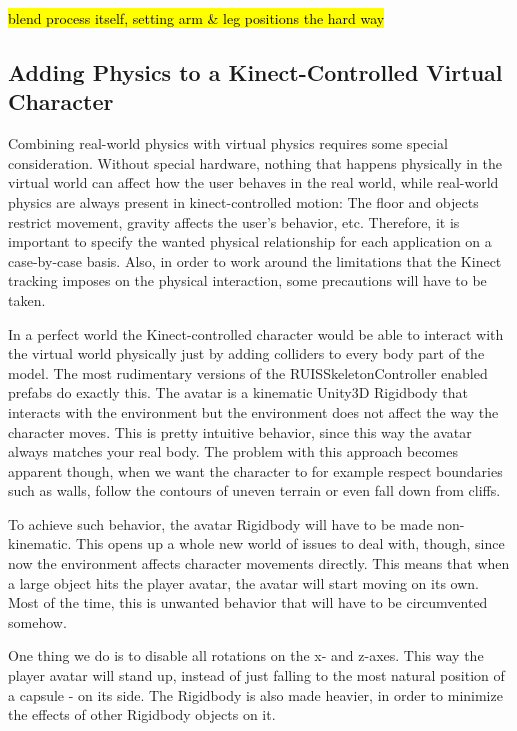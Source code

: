 \documentclass[12pt,a4paper,oneside,pdftex]{report}
\begin{document}
\hl{blend process itself, setting arm & leg positions the hard way}

\subsection{Adding Physics to a Kinect-Controlled Virtual Character}
\label{subsection:skeletontracking:physics}

Combining real-world physics with virtual physics requires some special consideration. Without special hardware, nothing that happens physically in the virtual world can affect how the user behaves in the real world, while real-world physics are always present in kinect-controlled motion: The floor and objects restrict movement, gravity affects the user's behavior, etc. Therefore, it is important to specify the wanted physical relationship for each application on a case-by-case basis. Also, in order to work around the limitations that the Kinect tracking imposes on the physical interaction, some precautions will have to be taken.

In a perfect world the Kinect-controlled character would be able to interact with the virtual world physically just by adding colliders to every body part of the model. The most rudimentary versions of the RUISSkeletonController enabled prefabs do exactly this. The avatar is a kinematic Unity3D Rigidbody that interacts with the environment but the environment does not affect the way the character moves. This is pretty intuitive behavior, since this way the avatar always matches your real body. The problem with this approach becomes apparent though, when we want the character to for example respect boundaries such as walls, follow the contours of uneven terrain or even fall down from cliffs.

To achieve such behavior, the avatar Rigidbody will have to be made non-kinematic. This opens up a whole new world of issues to deal with, though, since now the environment affects character movements directly. This means that when a large object hits the player avatar, the avatar will start moving on its own. Most of the time, this is unwanted behavior that will have to be circumvented somehow.

One thing we do is to disable all rotations on the x- and z-axes. This way the player avatar will stand up, instead of just falling to the most natural position of a capsule - on its side. The Rigidbody is also made heavier, in order to minimize the effects of other Rigidbody objects on it.
\end{document}
